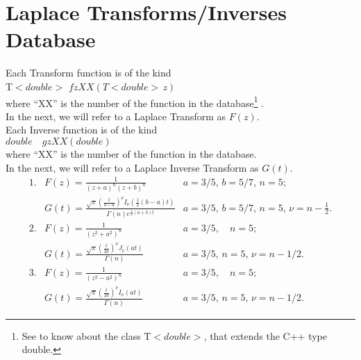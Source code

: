 \documentclass[10pt]{article}
\begin{document}
\section{Laplace Transforms/Inverses Database}


Each Transform function is of the kind\\

T$<double>$ \quad $fzXX(T<double> \,z)$\\

where “XX” is the number of the function in the database\footnote{See \cite{2} to know about the class T$<double>$, that extends the C++ type double.} .\\

In the next, we will refer to a Laplace Transform as $F(z)$.\\


Each Inverse function is of the kind\\

$double\quad gzXX(double)$\\

where “XX” is the number of the function in the database.\\

In the next, we will refer to a Laplace Inverse Transform as $G(t)$.\\



\[
\begin{array}{llr}
 1.& F(z)= \frac{1}{(z+a)^{n}(z+b)^{n}} &  a=3/5, \, b=5/7, \, n=5; \\[1cm]
 & G(t)= \frac{\sqrt{\pi}(\frac{t}{b-a})^{\nu}I_{\nu}(\frac{1}{2}(b-a)t)}{\Gamma(n)e^{\frac{1}{2}(a+b)t}} & a=3/5, \, b=5/7, \, n=5,\, \nu=n-\frac{1}{2}.\\[1cm]
2.&  F(z)= \frac{1}{(z^{2}+a^{2})^{n}} &  a=3/5,  \quad n=5; \\[1cm]
  & G(t)= \frac{\sqrt{\pi}(\frac{t}{2a})^{\nu}J_{\nu}(at)}{\Gamma(n)} & a=3/5, \, n=5, \, \nu=n-1/2.\\[1cm]
3.&  F(z)= \frac{1}{(z^{2}-a^{2})^{n}} &  a=3/5,  \quad n=5; \\[1cm]
 & G(t)= \frac{\sqrt{\pi}(\frac{t}{2a})^{\nu}I_{\nu}(at)}{\Gamma(n)} & a=3/5, \, n=5, \, \nu=n-1/2.
\end{array}
 \]
\end{document}
